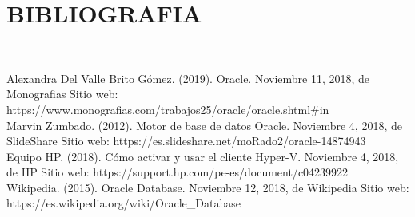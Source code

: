 \section{BIBLIOGRAFIA}
\begin{enumerate}
\vspace{12pt}\\
\begin{flushleft}

Alexandra Del Valle Brito Gómez. (2019). Oracle. Noviembre 11, 2018, de Monografias Sitio web: https://www.monografias.com/trabajos25/oracle/oracle.shtml#in
\vspace{12pt}\\
Marvin Zumbado. (2012). Motor de base de datos Oracle. Noviembre 4, 2018, de SlideShare Sitio web: https://es.slideshare.net/moRado2/oracle-14874943
\vspace{12pt}\\
Equipo HP. (2018). Cómo activar y usar el cliente Hyper-V. Noviembre 4, 2018, de HP Sitio web: https://support.hp.com/pe-es/document/c04239922
\vspace{12pt}\\
Wikipedia. (2015). Oracle Database. Noviembre 12, 2018, de Wikipedia Sitio web: https://es.wikipedia.org/wiki/Oracle_Database

\end{flushleft}
\end{enumerate}

